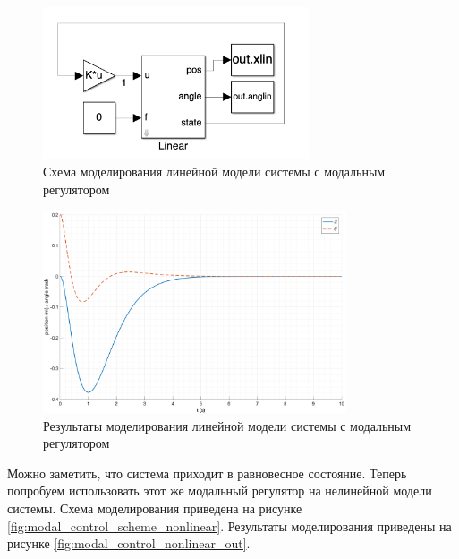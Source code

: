 \begin{figure}[ht!]
    \centering
    \includegraphics[width=0.7\textwidth]{media/modal_control_linear_scheme.png}
    \caption{Схема моделирования линейной модели системы с модальным регулятором}
    \label{fig:modal_control_scheme_linear}
\end{figure}
\begin{figure}[ht!]
    \centering
    \includegraphics[width=0.8\textwidth]{media/plots/modal_control/modal_control_linear_out_0.png}
    \caption{Результаты моделирования линейной модели системы с модальным регулятором}
    \label{fig:modal_control_linear_out}
\end{figure}

Можно заметить, что система приходит в равновесное состояние. Теперь попробуем использовать этот же 
модальный регулятор на нелинейной модели системы. Схема моделирования приведена на
рисунке \ref{fig:modal_control_scheme_nonlinear}. Результаты моделирования приведены на
рисунке \ref{fig:modal_control_nonlinear_out}.


